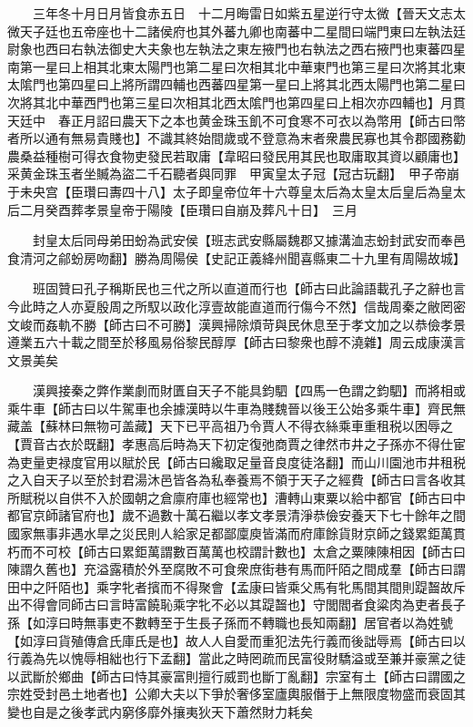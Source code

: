 　　三年冬十月日月皆食赤五日　十二月晦雷日如紫五星逆行守太微【晉天文志太微天子廷也五帝座也十二諸侯府也其外蕃九卿也南蕃中二星間曰端門東曰左執法廷尉象也西曰右執法御史大夫象也左執法之東左掖門也右執法之西右掖門也東蕃四星南第一星曰上相其北東太陽門也第二星曰次相其北中華東門也第三星曰次將其北東太隂門也第四星曰上將所謂四輔也西蕃四星第一星曰上將其北西太陽門也第二星曰次將其北中華西門也第三星曰次相其北西太隂門也第四星曰上相次亦四輔也】月貫天廷中　春正月詔曰農天下之本也黄金珠玉飢不可食寒不可衣以為幣用【師古曰幣者所以通有無易貴賤也】不識其終始間歲或不登意為末者衆農民寡也其令郡國務勸農桑益種樹可得衣食物吏發民若取庸【韋昭曰發民用其民也取庸取其資以顧庸也】采黄金珠玉者坐贓為盜二千石聽者與同罪　甲寅皇太子冠【冠古玩翻】　甲子帝崩于未央宫【臣瓚曰夀四十八】太子即皇帝位年十六尊皇太后為太皇太后皇后為皇太后二月癸酉葬孝景皇帝于陽陵【臣瓚曰自崩及葬凡十日】　三月

　　封皇太后同母弟田蚡為武安侯【班志武安縣屬魏郡又據溝洫志蚡封武安而奉邑食清河之鄃蚡房吻翻】勝為周陽侯【史記正義絳州聞喜縣東二十九里有周陽故城】

　　班固贊曰孔子稱斯民也三代之所以直道而行也【師古曰此論語載孔子之辭也言今此時之人亦夏殷周之所馭以政化淳壹故能直道而行傷今不然】信哉周秦之敝罔密文峻而姦軌不勝【師古曰不可勝】漢興掃除煩苛與民休息至于孝文加之以恭儉孝景遵業五六十載之間至於移風易俗黎民醇厚【師古曰黎衆也醇不澆雜】周云成康漢言文景美矣

　　漢興接秦之弊作業劇而財匱自天子不能具鈞駟【四馬一色謂之鈞駟】而將相或乘牛車【師古曰以牛駕車也余據漢時以牛車為賤魏晉以後王公始多乘牛車】齊民無藏盖【蘇林曰無物可盖藏】天下已平高祖乃令賈人不得衣絲乘車重租税以困辱之【賈音古衣於既翻】孝惠高后時為天下初定復弛商賈之律然市井之子孫亦不得仕宦為吏量吏禄度官用以賦於民【師古曰纔取足量音良度徒洛翻】而山川園池市井租税之入自天子以至於封君湯沐邑皆各為私奉養焉不領于天子之經費【師古曰言各收其所賦税以自供不入於國朝之倉廪府庫也經常也】漕轉山東粟以給中都官【師古曰中都官京師諸官府也】歲不過數十萬石繼以孝文孝景清淨恭儉安養天下七十餘年之間國家無事非遇水旱之災民則人給家足都鄙廩庾皆滿而府庫餘貨財京師之錢累鉅萬貫朽而不可校【師古曰累鉅萬謂數百萬萬也校謂計數也】太倉之粟陳陳相因【師古曰陳謂久舊也】充溢露積於外至腐敗不可食衆庶街巷有馬而阡陌之間成羣【師古曰謂田中之阡陌也】乘字牝者擯而不得聚會【孟康曰皆乘父馬有牝馬間其間則踶齧故斥出不得會同師古曰言時富饒恥乘字牝不必以其踶齧也】守閭閻者食粱肉為吏者長子孫【如淳曰時無事吏不數轉至于生長子孫而不轉職也長知兩翻】居官者以為姓號【如淳曰貨殖傳倉氏庫氏是也】故人人自愛而重犯法先行義而後詘辱焉【師古曰以行義為先以愧辱相絀也行下孟翻】當此之時罔疏而民富役財驕溢或至兼并豪黨之徒以武斷於鄉曲【師古曰恃其豪富則擅行威罰也斷丁亂翻】宗室有土【師古曰謂國之宗姓受封邑土地者也】公卿大夫以下爭於奢侈室廬輿服僭于上無限度物盛而衰固其變也自是之後孝武内窮侈靡外攘夷狄天下蕭然財力耗矣

